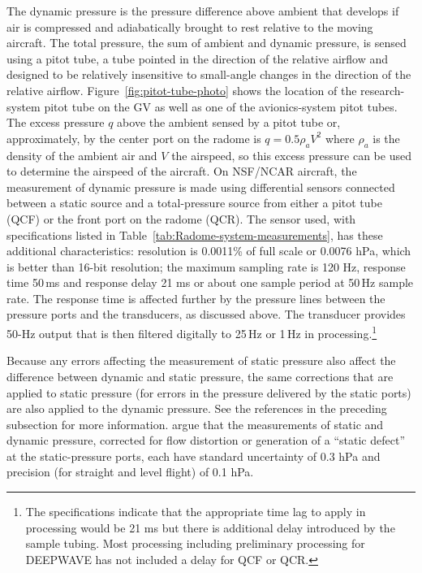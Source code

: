 \documentclass[12pt,twoside,english]{article}\usepackage[]{graphicx}\usepackage[]{color}
\let\OrgIndex\index
\renewcommand*{\index}[1]{\OrgIndex{#1}}
\begin{document}
{The dynamic pressure is the pressure difference above ambient that develops if air is compressed and adiabatically brought to rest relative to the moving aircraft. The total pressure, the sum of ambient and dynamic pressure, is sensed using a pitot tube, a tube pointed in the direction of the relative airflow and designed to be relatively insensitive to small-angle changes in the direction of the relative airflow. Figure~\ref{fig:pitot-tube-photo} shows the location of the research-system pitot tube on the GV as well as one of the avionics-system pitot tubes. The excess pressure $q$ above the ambient sensed by a pitot tube or, approximately, by the center port on the radome is $q=0.5\rho_{a}V^{2}$ where $\rho_{a}$ is the density of the ambient air and $V$ the airspeed, so this excess pressure can be used to determine the airspeed of the aircraft. On NSF/NCAR aircraft, the measurement of dynamic pressure is made using differential sensors connected between a static source and a total-pressure source from either a pitot tube (QCF) or the front port on the radome (QCR). The sensor used, with specifications listed in Table~\ref{tab:Radome-system-measurements}, has these additional characteristics: resolution is 0.0011\% of full scale or 0.0076 hPa, which is better than 16-bit resolution; the maximum sampling rate is 120 Hz, response time 50\,ms and response delay 21 ms or about one sample period at 50\,Hz sample rate. The response time is affected further by the pressure lines between the pressure ports and the transducers, as discussed above. The transducer provides 50-Hz output that is then filtered digitally to 25\,Hz or 1\,Hz in processing.\footnote{The specifications indicate that the appropriate time lag to apply in processing would be 21 ms but there is additional delay introduced by the sample tubing. Most processing including preliminary processing for DEEPWAVE has not included a delay for QCF or QCR.} 

Because any errors affecting the measurement of static pressure also affect the difference between dynamic and static pressure, the same corrections that are applied to static pressure (for errors in the pressure delivered by the static ports) are also applied to the dynamic pressure. See the references in the preceding subsection for more information. \citet{CooperEtAl2014} argue that the measurements of static and dynamic pressure, corrected for flow distortion or generation of a ``static defect'' at the static-pressure ports, each have standard uncertainty of 0.3 hPa and precision (for straight and level flight) of 0.1 hPa. 

}
\end{document}
